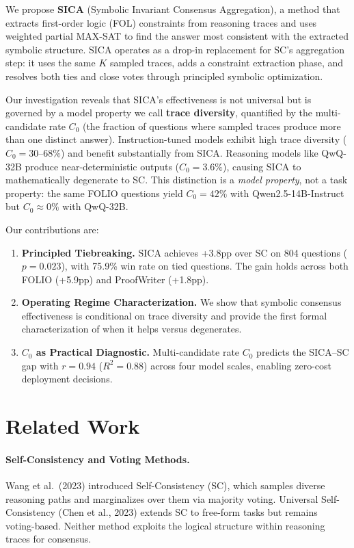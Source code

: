 \documentclass[11pt,a4paper]{article}
\begin{document}
We propose \textbf{SICA} (Symbolic Invariant Consensus Aggregation), a method that extracts first-order logic (FOL) constraints from reasoning traces and uses weighted partial MAX-SAT to find the answer most consistent with the extracted symbolic structure.
SICA operates as a drop-in replacement for SC's aggregation step: it uses the same $K$ sampled traces, adds a constraint extraction phase, and resolves both ties and close votes through principled symbolic optimization.

Our investigation reveals that SICA's effectiveness is not universal but is governed by a model property we call \textbf{trace diversity}, quantified by the multi-candidate rate $C_0$ (the fraction of questions where sampled traces produce more than one distinct answer).
Instruction-tuned models exhibit high trace diversity ($C_0 = 30\text{--}68\%$) and benefit substantially from SICA.
Reasoning models like QwQ-32B produce near-deterministic outputs ($C_0 = 3.6\%$), causing SICA to mathematically degenerate to SC.
This distinction is a \emph{model property}, not a task property: the same FOLIO questions yield $C_0 = 42\%$ with Qwen2.5-14B-Instruct but $C_0 \approx 0\%$ with QwQ-32B.

Our contributions are:
\begin{enumerate}
    \item \textbf{Principled Tiebreaking.} SICA achieves +3.8pp over SC on 804 questions ($p = 0.023$), with 75.9\% win rate on tied questions. The gain holds across both FOLIO (+5.9pp) and ProofWriter (+1.8pp).
    \item \textbf{Operating Regime Characterization.} We show that symbolic consensus effectiveness is conditional on trace diversity and provide the first formal characterization of when it helps versus degenerates.
    \item \textbf{$C_0$ as Practical Diagnostic.} Multi-candidate rate $C_0$ predicts the SICA--SC gap with $r = 0.94$ ($R^2 = 0.88$) across four model scales, enabling zero-cost deployment decisions.
\end{enumerate}


\section{Related Work}
\label{sec:related}

\paragraph{Self-Consistency and Voting Methods.}
Wang et al.\ (2023) introduced Self-Consistency (SC), which samples diverse reasoning paths and marginalizes over them via majority voting.
Universal Self-Consistency (Chen et al., 2023) extends SC to free-form tasks but remains voting-based.
Neither method exploits the logical structure within reasoning traces for consensus.
\end{document}
